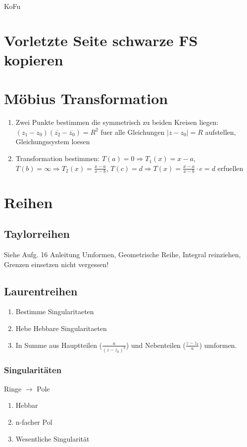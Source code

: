 \documentclass[10pt,a4paper]{article}
\begin{document}
KoFu

\section{Vorletzte Seite schwarze FS kopieren}

\section{Möbius Transformation}
\begin{enumerate}
\item Zwei Punkte bestimmen die symmetrisch zu beiden Kreisen liegen: $(z_1 - z_0)(\overline{z_2} - \overline{z_0}) = R^2$ fuer alle Gleichungen $|z - z_0| = R$ aufstellen, Gleichungssystem loesen
\item Transformation bestimmen: $T(a) = 0 \Rightarrow T_1(x) = x - a$, $T(b) = \infty \Rightarrow T_2(x) = \frac{x-a}{x-b}$, $T(c) = d \Rightarrow T(x) = \frac{x-a}{x-b} \cdot e = d$ erfuellen
\end{enumerate}

\section{Reihen}
\subsection{Taylorreihen}
Siehe Aufg. 16 Anleitung
Umformen, Geometrische Reihe, Integral reinziehen, Grenzen einsetzen nicht vergessen!


\subsection{Laurentreihen}
\begin{enumerate}
\item Bestimme Singularitaeten
\item Hebe Hebbare Singularitaeten
\item In Summe aus Hauptteilen ($ \frac{a}{(z-z_k)^k}$) und Nebenteilen ($ \frac{z-z_k}{a}$) umformen.
\end{enumerate}

\subsubsection{Singularitäten}
Ringe $\rightarrow$ Pole
\begin{enumerate}
 \item Hebbar
 \item n-facher Pol
 \item Wesentliche Singularität
\end{enumerate}
\end{document}
